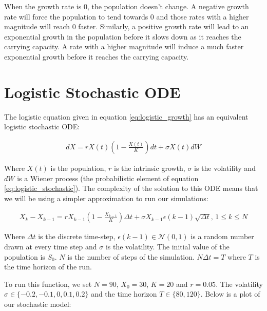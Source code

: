 \documentclass[]{report}
\begin{document}
	When the growth rate is 0, the population doesn't change. A negative growth rate will force the population to tend towards 0 and those 
	rates with a higher magnitude will reach 0 faster. Similarly, a positive growth rate will lead to an exponential growth in the population 
	before it slows down as it reaches the carrying capacity. A rate with a higher magnitude will induce a much faster exponential growth before it 
	reaches the carrying capacity.
	
	\section{Logistic Stochastic ODE}
	The logistic equation given in equation \ref{eq:logistic_growth} has an equivalent logistic stochastic ODE:
	
	\begin{align}
		dX = rX(t)\left(1 - \frac{X(t)}{K}\right)dt + \sigma X(t)dW
		\label{eq:logistic_stochastic}
	\end{align} 

	Where $X(t)$ is the population, $r$ is the intrinsic growth, $\sigma$ is the volatility and $dW$ is a Wiener process (the probabilistic element of equation \ref{eq:logistic_stochastic}). The complexity of the solution to this ODE means that we will be using a simpler approximation to run our simulations: 
	
	\begin{align}
		X_k - X_{k - 1} = rX_{k - 1}\left(1 - \frac{X_{k - 1}}{K}\right)\Delta t + \sigma X_{k - 1}\epsilon (k - 1)\sqrt{\Delta t}, \hspace{2pt} 1 \leq k \leq N
	\end{align}

	Where $\Delta t$ is the discrete time-step, $\epsilon (k - 1) \in \mathcal{N}(0, 1)$ is a random number drawn at every time step and $\sigma$ is the volatility. The initial value of the population is $S_0$. $N$ is the number of steps of the simulation. $N \Delta t = T$ where $T$ is the time horizon of the run. 
	
	To run this function, we set $N = 90$, $X_0 = 30$, $K = 20$ and $r = 0.05$. The volatility $\sigma \in \{-0.2, -0.1, 0, 0.1, 0.2\}$ and the time horizon $T \in \{80, 120\}$. Below is a plot of our stochastic model:
	
\end{document}
